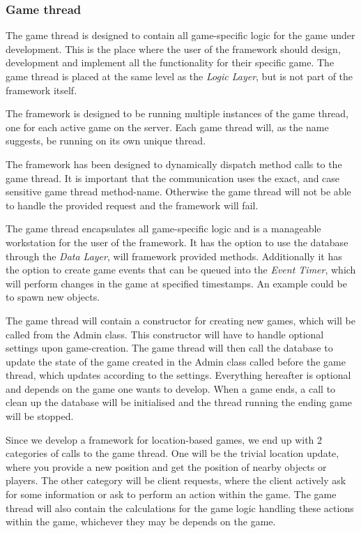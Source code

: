\subsubsection{Game thread}\label{designgamethread}
The game thread is designed to contain all game-specific logic for the game under development. This is the place where the user of the framework should design, development and implement all the functionality for their specific game. The game thread is placed at the same level as the \textit{Logic Layer}, but is not part of the framework itself. 

The framework is designed to be running multiple instances of the game thread, one for each active game on the server. Each game thread will, as the name suggests, be running on its own unique thread. 

The framework has been designed to dynamically dispatch method calls to the game thread. It is important that the communication uses the exact, and case sensitive game thread method-name. Otherwise the game thread will not be able to handle the provided request and the framework will fail. 

The game thread encapsulates all game-specific logic and is a manageable workstation for the user of the framework. It has the option to use the database through the \textit{Data Layer}, will framework provided methods. Additionally it has the option to create game events that can be queued into the \textit{Event Timer}, which will perform changes in the game at specified timestamps. An example could be to spawn new objects.

The game thread will contain a constructor for creating new games, which will be called from the Admin class. This constructor will have to handle optional settings upon game-creation. The game thread will then call the database to update the state of the game created in the Admin class called before the game thread, which updates according to the settings. Everything hereafter is optional and depends on the game one wants to develop. When a game ends, a call to clean up the database will be initialised and the thread running the ending game will be stopped.

Since we develop a framework for location-based games, we end up with 2 categories of calls to the game thread. One will be the trivial location update, where you provide a new position and get the position of nearby objects or players. The other category will be client requests, where the client actively ask for some information or ask to perform an action within the game. The game thread will also contain the calculations for the game logic handling these actions within the game, whichever they may be depends on the game. 